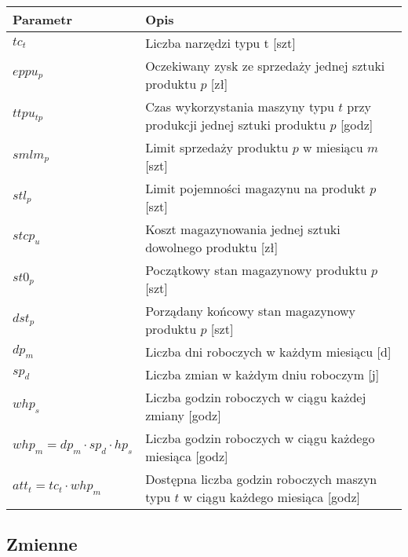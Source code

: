 \documentclass[12pt]{article}
\begin{document}
\begin{table}[h!]
\centering
\begin{tabular}{|l|p{10cm}|}
\hline
Parametr & Opis \\
\hline
$tc_t$ & Liczba narzędzi typu t [szt] \\
\hline
$eppu_p$ & Oczekiwany zysk ze sprzedaży jednej sztuki produktu $p$ [zł] \\
\hline
$ttpu_{tp}$ & Czas wykorzystania maszyny typu $t$ przy produkcji jednej sztuki produktu $p$ [godz] \\
\hline
$smlm_p$ & Limit sprzedaży produktu $p$ w miesiącu $m$ [szt] \\
\hline
$stl_p$ & Limit pojemności magazynu na produkt $p$ [szt] \\
\hline
$stcp_u$ & Koszt magazynowania jednej sztuki dowolnego produktu [zł] \\
\hline
$st0_p$ & Początkowy stan magazynowy produktu $p$ [szt] \\
\hline
$dst_p$ & Porządany końcowy stan magazynowy produktu $p$ [szt] \\
\hline
$dp_m$ & Liczba dni roboczych w każdym miesiącu [d] \\
\hline
$sp_d$ & Liczba zmian w każdym dniu roboczym [j] \\
\hline
$whp_s$ & Liczba godzin roboczych w ciągu każdej zmiany [godz] \\
\hline
$whp_m = dp_m \cdot sp_d \cdot hp_s$ & Liczba godzin roboczych w ciągu każdego miesiąca [godz] \\
\hline
$att_t = tc_t \cdot whp_m$ & Dostępna liczba godzin roboczych maszyn typu $t$ w ciągu każdego miesiąca [godz] \\
\hline
\end{tabular}
\end{table}

\subsection{Zmienne}
\end{document}

